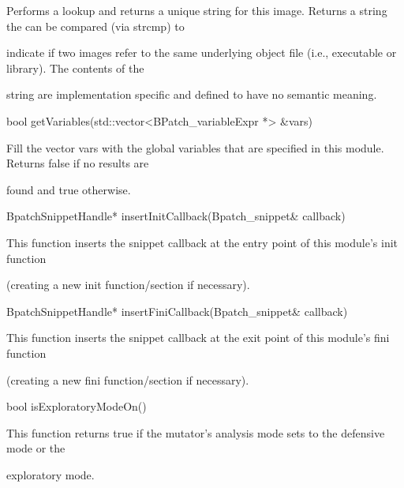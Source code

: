 {{{{

Performs a lookup and returns a unique string for this image. Returns a string the can be compared (via strcmp) to

indicate if two images refer to the same underlying object file (i.e., executable or library). The contents of the

string are implementation specific and defined to have no semantic meaning.}



{

bool getVariables(std::vector<BPatch_variableExpr *> &vars)}



{

Fill the vector vars with the global variables that are specified in this module. Returns false if no results are

found and true otherwise.}



{

BpatchSnippetHandle* insertInitCallback(Bpatch_snippet& callback)



{

This function inserts the snippet callback at the entry point of this module's init function

(creating a new init function/section if necessary).}



{

BpatchSnippetHandle* insertFiniCallback(Bpatch_snippet& callback)



{

This function inserts the snippet callback at the exit point of this module's fini function

(creating a new fini function/section if necessary).}





\bigskip



{

bool isExploratoryModeOn()



{

This function returns true if the mutator's analysis mode sets to the defensive mode or the

exploratory mode.}



}}}}}}
